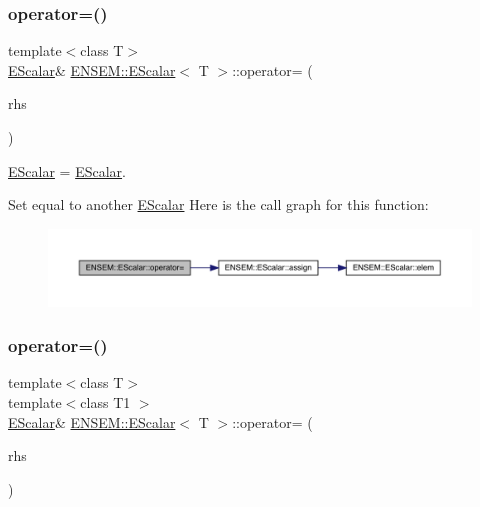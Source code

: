 \subsubsection{\texorpdfstring{operator=()}{operator=()}\hspace{0.1cm}{\footnotesize\ttfamily [6/8]}}
{\footnotesize\ttfamily template$<$class T$>$ \\
\mbox{\hyperlink{classENSEM_1_1EScalar}{E\+Scalar}}\& \mbox{\hyperlink{classENSEM_1_1EScalar}{E\+N\+S\+E\+M\+::\+E\+Scalar}}$<$ T $>$\+::operator= (\begin{DoxyParamCaption}\item[{const \mbox{\hyperlink{classENSEM_1_1EScalar}{E\+Scalar}}$<$ T $>$ \&}]{rhs }\end{DoxyParamCaption})\hspace{0.3cm}{\ttfamily [inline]}}



\mbox{\hyperlink{classENSEM_1_1EScalar}{E\+Scalar}} = \mbox{\hyperlink{classENSEM_1_1EScalar}{E\+Scalar}}. 

Set equal to another \mbox{\hyperlink{classENSEM_1_1EScalar}{E\+Scalar}} Here is the call graph for this function\+:
\nopagebreak
\begin{figure}[H]
\begin{center}
\leavevmode
\includegraphics[width=350pt]{d0/d82/classENSEM_1_1EScalar_ade0daedd37868c24651613bb6f499fd4_cgraph}
\end{center}
\end{figure}
\mbox{\label{classENSEM_1_1EScalar_a8ec804b8b082a748bb364fbb4a511757}} 
\subsubsection{\texorpdfstring{operator=()}{operator=()}\hspace{0.1cm}{\footnotesize\ttfamily [7/8]}}
{\footnotesize\ttfamily template$<$class T$>$ \\
template$<$class T1 $>$ \\
\mbox{\hyperlink{classENSEM_1_1EScalar}{E\+Scalar}}\& \mbox{\hyperlink{classENSEM_1_1EScalar}{E\+N\+S\+E\+M\+::\+E\+Scalar}}$<$ T $>$\+::operator= (\begin{DoxyParamCaption}\item[{const \mbox{\hyperlink{classENSEM_1_1EScalar}{E\+Scalar}}$<$ T1 $>$ \&}]{rhs }\end{DoxyParamCaption})\hspace{0.3cm}{\ttfamily [inline]}}



